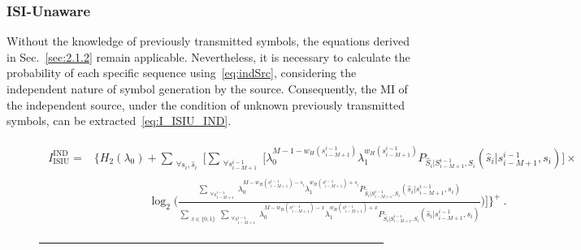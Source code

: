 \documentclass[journal]{IEEEtranTCOM}
\begin{document}
\subsubsection{ISI-Unaware}
Without the knowledge of previously transmitted symbols, the equations derived in Sec.~\ref{sec:2.1.2} remain applicable. Nevertheless, it is necessary to calculate the probability of each specific sequence using~\eqref{eq:indSrc}, considering the independent nature of symbol generation by the source. Consequently, the MI of the independent source, under the condition of unknown previously transmitted symbols, can be extracted~\eqref{eq:I_ISIU_IND}.
\begin{figure}[t!]
\begin{align}
\begin{split}
    I_{\text{ISIU}}^{\text{IND}} =& \Bigg\{H_{2}(\lambda_{0})+
    \sum\limits_{\substack{\forall s_{i},\hat{s}_{i}}}\Bigg[\sum\limits_{\substack{\forall s^{i-1}_{i-M+1}}}\bigg[\lambda_{0}^{M-1-w_{H}(s_{i-M+1}^{i-1})}\lambda_{1}^{w_{H}(s_{i-M+1}^{i-1})}P_{\hat{S}_{i}|S^{i-1}_{i-M+1},S_{i}}(\hat{s}_{i}|s^{i-1}_{i-M+1},s_{i})\bigg]\times
    \\&\hspace{2cm}
    \log_{2}\Big(\frac{\sum\limits_{\substack{\forall s^{i-1}_{i-M+1}}}\lambda_{0}^{M-w_{H}(s_{i-M+1}^{i-1})-s_{i}}\lambda_{1}^{w_{H}(s_{i-M+1}^{i-1})+s_{i}}P_{\hat{S}_{i}|S^{i-1}_{i-M+1},S_{i}}(\hat{s}_{i}|s^{i-1}_{i-M+1},s_{i})}{\sum\limits_{\substack{x\in\{0,1\}}}\sum\limits_{\substack{\forall s^{i-1}_{i-M+1}}}\lambda_{0}^{M-w_{H}(s_{i-M+1}^{i-1})-x}\lambda_{1}^{w_{H}(s_{i-M+1}^{i-1})+x}P_{\hat{S}_{i}|S^{i-1}_{i-M+1},S_{i}}(\hat{s}_{i}|s^{i-1}_{i-M+1},s_{i})}\Big)\Bigg]\Bigg\}^{+}~.\label{eq:I_ISIU_IND}
\end{split}
\end{align}
\hrule
\end{figure}
\end{document}
